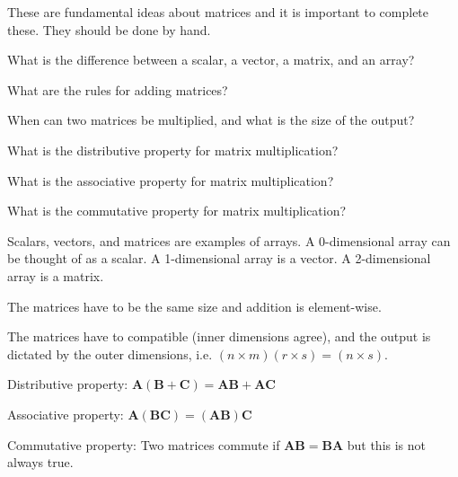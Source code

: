 \begin{prob}
These are fundamental ideas about matrices and it is important to complete these. They should be done by hand.
\be
\item What is the difference between a scalar, a vector, a matrix, and an array?
\item What are the rules for adding matrices?
\item When can two matrices be multiplied, and what is the size of the output?
\item What is the distributive property for matrix multiplication?
\item What is the associative property for matrix multiplication?
\item What is the commutative property for matrix multiplication?
\ee
\end{prob}
\begin{sol}
\be
\item Scalars, vectors, and matrices are examples of arrays. A 0-dimensional array can be thought of as a scalar. A 1-dimensional array is a vector. A 2-dimensional array is a matrix.
\item The matrices have to be the same size and addition is element-wise.
\item The matrices have to compatible (inner dimensions agree), and the output is dictated by the outer dimensions, i.e. $(n \times m) (r \times s) = (n \times s)$.
\item Distributive property: $\mathbf{A} (\mathbf{B} + \mathbf{C}) = \mathbf{A} \mathbf{B} + \mathbf{A} \mathbf{C}$
\item Associative property: $\mathbf{A} (\mathbf{B} \mathbf{C} ) = (\mathbf{A} \mathbf{B}) \mathbf{C}$
\item Commutative property:
Two matrices commute if $\mathbf{A} \mathbf{B} = \mathbf{B} \mathbf{A}$ but this is not always true.
\ee
\end{sol}

